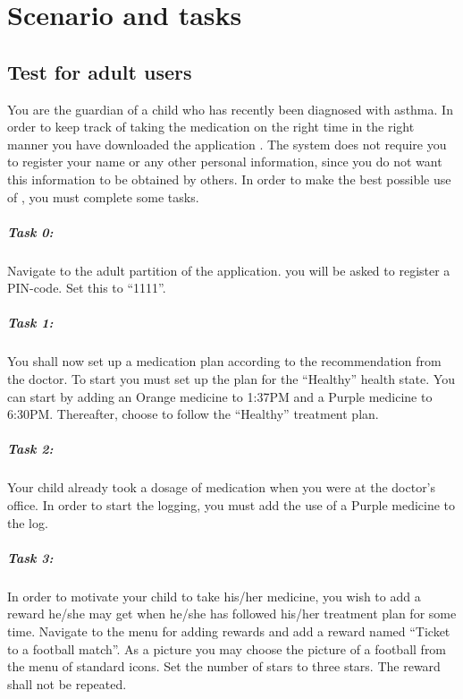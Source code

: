 \chapter{Scenario and tasks}
\label{app:scenarioandtasks}

\section{Test for adult users}
\label{sec:parentstest}
You are the guardian of a child who has recently been diagnosed with asthma. In order to keep track of taking the medication on the right time in the right manner you have downloaded the application \app{}. The system does not require you to register your name or any other personal information, since you do not want this information to be obtained by others. In order to make the best possible use of \app{}, you must complete some tasks. 

\paragraph{Task 0:}

Navigate to the adult partition of the application. you will be asked to register a PIN-code. Set this to ``1111''.


\paragraph{Task 1:}

You shall now set up a medication plan according to the recommendation from the doctor. To start you must set up the plan for the ``Healthy'' health state. You can start by adding an Orange medicine to 1:37PM and a Purple medicine to 6:30PM. Thereafter, choose to follow the ``Healthy'' treatment plan.


\paragraph{Task 2:}

Your child already took a dosage of medication when you were at the doctor's office. In order to start the logging, you must add the use of a Purple medicine to the log. 


\paragraph{Task 3:}

In order to motivate your child to take his/her medicine, you wish to add a reward he/she may get when he/she has followed his/her treatment plan for some time. 
Navigate to the menu for adding rewards and add a reward named ``Ticket to a football match''. As a picture you may choose the picture of a football from the menu of standard icons. Set the number of stars to three stars. The reward shall not be repeated. 


